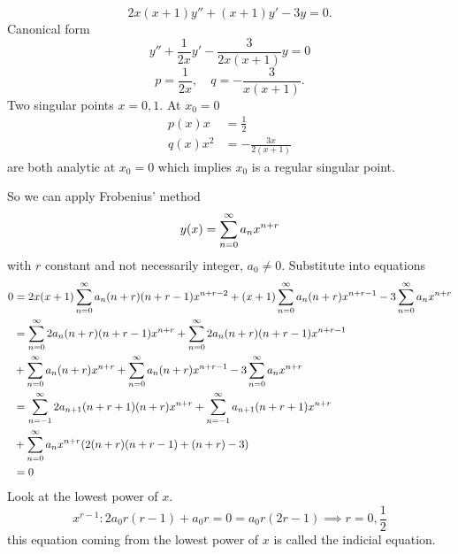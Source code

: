 \documentclass[10pt, a4paper]{article}
\begin{document}
\begin{example}
    \[
    2x(x + 1)y'' + (x + 1)y' - 3y = 0.
    \]
    Canonical form
    \[
    y'' + \frac{1}{2x}y' - \frac{3}{2x(x + 1)}y = 0
    \]
    \[
    p = \frac{1}{2x},\quad q = -\frac{3}{x(x + 1)}.
    \]
    Two singular points $x = 0, 1$.
    At $x_0 = 0$
    \begin{align*}
        p(x)x &= \frac{1}{2} \\
        q(x)x ^ 2 &= -\frac{3x}{2(x + 1)}
    \end{align*}
    are both analytic at $x_0 = 0$ which implies $x_0$ is a regular singular point.

    So we can apply Frobenius' method
    \[
    y(x) = \infsum[n = 0]a_nx ^ {n + r}
    \]
    with $r$ constant and not necessarily integer,
    $a_0 \neq 0$.
    Substitute into equations
    \begin{align*}
        0 &= 2x(x + 1)\infsum[n = 0]a_n(n + r)(n + r - 1)x ^ {n + r - 2} + (x + 1)\infsum[n = 0]a_n(n + r)x ^ {n + r - 1} - 3\infsum[n = 0]a_nx ^ {n + r} \\
        &= \infsum[n = 0]2a_n(n + r)(n + r - 1)x ^ {n + r} + \infsum[n = 0]2a_n(n + r)(n + r - 1)x ^ {n + r - 1} \\
        &+ \infsum[n = 0]a_n(n + r)x ^ {n + r} + \infsum[n = 0]a_n(n + r)x ^ {n + r - 1} - 3\infsum[n = 0]a_nx ^ {n + r} \\
        &= \infsum[n = -1]2a_{n + 1}(n + r + 1)(n + r)x ^ {n + r} + \infsum[n = -1]a_{n + 1}(n + r + 1)x ^ {n + r} \\
        &+ \infsum[n = 0]a_nx ^ {n + r}(2(n + r)(n + r - 1) + (n + r) - 3) \\
        &= 0
    \end{align*}
    Look at the lowest power of $x$.
    \[
    x ^ {r - 1}: 2a_0r(r - 1) + a_0r = 0  = a_0r(2r - 1) \implies r = 0, \frac{1}{2}
    \]
    this equation coming from the lowest power of $x$ is called the indicial equation.


\end{example}
\end{document}
